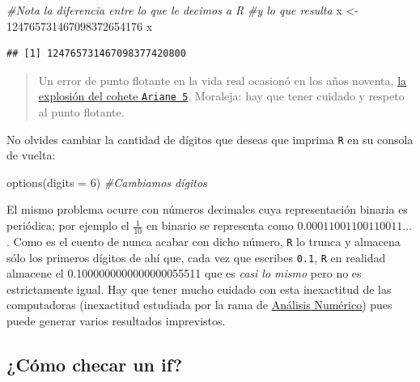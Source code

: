 \documentclass[
]{book}
\newenvironment{Shaded}{\begin{snugshade}}{\end{snugshade}}
\newcommand{\AttributeTok}[1]{\textcolor[rgb]{0.77,0.63,0.00}{#1}}
\newcommand{\CommentTok}[1]{\textcolor[rgb]{0.56,0.35,0.01}{\textit{#1}}}
\newcommand{\DecValTok}[1]{\textcolor[rgb]{0.00,0.00,0.81}{#1}}
\newcommand{\FunctionTok}[1]{\textcolor[rgb]{0.00,0.00,0.00}{#1}}
\newcommand{\NormalTok}[1]{#1}
\newcommand{\OtherTok}[1]{\textcolor[rgb]{0.56,0.35,0.01}{#1}}
\begin{document}
\begin{Shaded}
\begin{Highlighting}[]
\CommentTok{\#Nota la diferencia entre lo que le decimos a R}
\CommentTok{\#y lo que resulta}
\NormalTok{x }\OtherTok{\textless{}{-}} \DecValTok{124765731467098372654176}
\NormalTok{x}
\end{Highlighting}
\end{Shaded}

\begin{verbatim}
## [1] 124765731467098377420800
\end{verbatim}

\begin{quote}
Un error de punto flotante en la vida real ocasionó en los años noventa, \href{https://www.esa.int/Newsroom/Press_Releases/Ariane_501_-_Presentation_of_Inquiry_Board_report}{la explosión del cohete \texttt{Ariane\ 5}}. Moraleja: hay que tener cuidado y respeto al punto flotante.
\end{quote}

No olvides cambiar la cantidad de dígitos que deseas que imprima \texttt{R} en su consola de vuelta:

\begin{Shaded}
\begin{Highlighting}[]
\FunctionTok{options}\NormalTok{(}\AttributeTok{digits =} \DecValTok{6}\NormalTok{) }\CommentTok{\#Cambiamos dígitos}
\end{Highlighting}
\end{Shaded}

El mismo problema ocurre con números decimales cuya representación binaria es periódica; por ejemplo el \(\frac{1}{10}\) en binario se representa como \(0.0001100110011\overline{0011}\dots\). Como es el cuento de nunca acabar con dicho número, \texttt{R} lo trunca y almacena sólo los primeros dígitos de ahí que, cada vez que escribes \texttt{0.1}, \texttt{R} en realidad almacene el 0.1000000000000000055511 que es \emph{casi lo mismo} pero no es estrictamente igual. Hay que tener mucho cuidado con esta inexactitud de las computadoras (inexactitud estudiada por la rama de \href{https://www.springer.com/gp/book/9781461484523}{Análisis Numérico}) pues puede generar varios resultados imprevistos.

\hypertarget{cuxf3mo-checar-un-if}{%
\subsection{¿Cómo checar un if?}\label{cuxf3mo-checar-un-if}}
\end{document}
